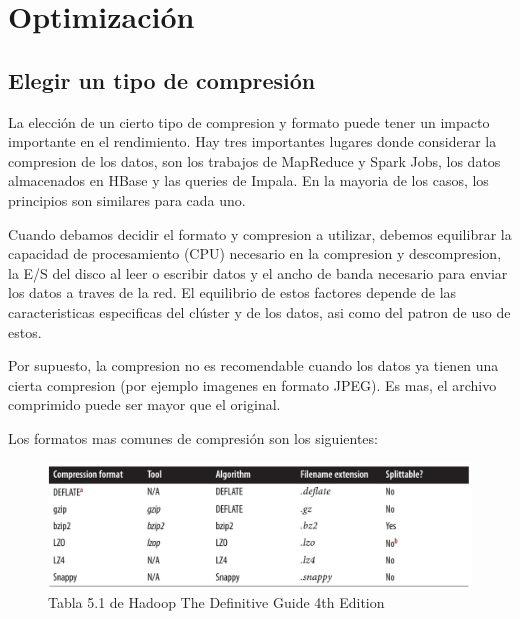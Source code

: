 \documentclass[a4paper,10pt]{article}
\begin{document}
\section{Optimización}

\subsection{Elegir un tipo de compresión}

La elección de un cierto tipo de compresion y formato puede tener un impacto importante en el rendimiento. Hay tres importantes lugares donde considerar la compresion de los datos, son los trabajos de MapReduce y Spark Jobs, los datos almacenados en HBase y las queries de Impala. En la mayoria de los casos, los principios son similares para cada uno.

Cuando debamos decidir el formato y compresion a utilizar, debemos equilibrar la capacidad de procesamiento (CPU) necesario en la compresion y descompresion, la E/S del disco al leer o escribir datos y el ancho de banda necesario para enviar los datos a traves de la red. El equilibrio de estos factores depende de las caracteristicas especificas del clúster y de los datos, asi como del patron de uso de estos.

Por supuesto, la compresion no es recomendable cuando los datos ya tienen una cierta compresion (por ejemplo imagenes en formato JPEG). Es mas, el archivo comprimido puede ser mayor que el original.

Los formatos mas comunes de compresión son los siguientes:

\begin{figure}[H]
\centering
\includegraphics[width=500pt]{./fotos/eleccioncompresion.jpg}
\caption{Tabla 5.1 de Hadoop The Definitive Guide 4th Edition}
\end{figure}
\end{document}

